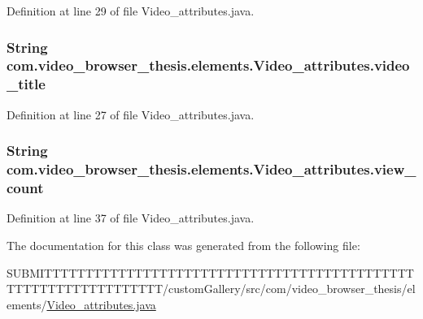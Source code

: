 Definition at line 29 of file Video\-\_\-attributes.\-java.

\hypertarget{classcom_1_1video__browser__thesis_1_1elements_1_1_video__attributes_a90fcc84191f2c525436bdc0cfb1653ea}{
\subsubsection[{video\-\_\-title}]{\setlength{\rightskip}{0pt plus 5cm}String com.\-video\-\_\-browser\-\_\-thesis.\-elements.\-Video\-\_\-attributes.\-video\-\_\-title}}\label{classcom_1_1video__browser__thesis_1_1elements_1_1_video__attributes_a90fcc84191f2c525436bdc0cfb1653ea}


Definition at line 27 of file Video\-\_\-attributes.\-java.

\hypertarget{classcom_1_1video__browser__thesis_1_1elements_1_1_video__attributes_ab32c45e2134b0fbe136713e179ca3bb6}{
\subsubsection[{view\-\_\-count}]{\setlength{\rightskip}{0pt plus 5cm}String com.\-video\-\_\-browser\-\_\-thesis.\-elements.\-Video\-\_\-attributes.\-view\-\_\-count}}\label{classcom_1_1video__browser__thesis_1_1elements_1_1_video__attributes_ab32c45e2134b0fbe136713e179ca3bb6}


Definition at line 37 of file Video\-\_\-attributes.\-java.



The documentation for this class was generated from the following file\-:\begin{DoxyCompactItemize}
\item 
S\-U\-B\-M\-I\-T\-T\-T\-T\-T\-T\-T\-T\-T\-T\-T\-T\-T\-T\-T\-T\-T\-T\-T\-T\-T\-T\-T\-T\-T\-T\-T\-T\-T\-T\-T\-T\-T\-T\-T\-T\-T\-T\-T\-T\-T\-T\-T\-T\-T\-T\-T\-T\-T\-T\-T\-T\-T\-T\-T\-T\-T\-T\-T\-T\-T\-T\-T\-T/custom\-Gallery/src/com/video\-\_\-browser\-\_\-thesis/elements/\hyperlink{_video__attributes_8java}{Video\-\_\-attributes.\-java}\end{DoxyCompactItemize}
